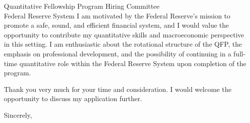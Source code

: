 \documentclass[11pt,letterpaper]{letter}
\begin{document}
\begin{letter}{
Quantitative Fellowship Program Hiring Committee \\
Federal Reserve System
}
I am motivated by the Federal Reserve’s mission to promote a safe, sound, and efficient financial system, and I would value the opportunity to contribute my quantitative skills and macroeconomic perspective in this setting. I am enthusiastic about the rotational structure of the QFP, the emphasis on professional development, and the possibility of continuing in a full-time quantitative role within the Federal Reserve System upon completion of the program.

Thank you very much for your time and consideration. I would welcome the opportunity to discuss my application further.

\closing{Sincerely,}

\end{letter}
\end{document}
